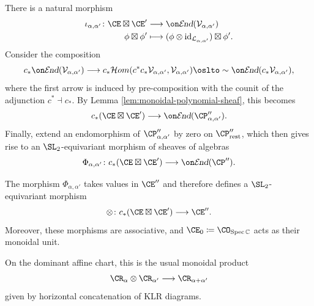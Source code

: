 \documentclass[11pt,reqno]{amsart}
\begin{document}
There is a natural morphism 
\begin{align*}
    \iota_{\alpha,\alpha'}\colon \CE\boxtimes\CE'&\longrightarrow\shend(\mathcal V_{\alpha,\alpha'})\\
    \phi\boxtimes\phi'&\longmapsto(\phi\otimes\id_{\mathcal L_{\alpha,\alpha'}})\boxtimes\phi'.
\end{align*}
Consider the composition \[c_*\shend(\mathcal V_{\alpha,\alpha'})\longrightarrow c_*\mathcal{H}om(c^*c_*\mathcal V_{\alpha,\alpha'}, \mathcal V_{\alpha,\alpha'})\simlto\shend(c_*\mathcal V_{\alpha,\alpha'}),\] where the first arrow is induced by pre-composition with the counit of the adjunction $c^*\dashv c_*.$ By Lemma \ref{lem:monoidal-polynomial-sheaf}, this becomes
\[c_*(\CE\boxtimes\CE')\longrightarrow\shend(\CP''_{\alpha,\alpha'}).\] Finally, extend an endomorphism of $\CP''_{\alpha,\alpha'}$ by zero on $\CP''_{\mathrm{rest}}$, which then gives rise to an $\SL_2$-equivariant morphism of sheaves of algebras
\[\Phi_{\alpha,\alpha'}\colon c_*(\CE\boxtimes\CE')\longrightarrow\shend(\CP'').\] 
\begin{theorem}\label{thm:A_N monoidal}
The morphism $\Phi_{\alpha,\alpha'}$ takes values in $\CE''$ and
therefore defines a $\SL_2$-equivariant morphism \[\otimes\colon c_*(\CE\boxtimes\CE')\longrightarrow\CE''.\]Moreover, these morphisms are associative, and $\CE_0\coloneqq \CO_{\Spec \BC}$ acts as their monoidal unit. 

On the dominant affine chart, this is the usual monoidal product
\[\CR_\alpha\otimes\CR_{\alpha'}\longrightarrow\CR_{\alpha+\alpha'}\]
given by horizontal concatenation of KLR diagrams.
\end{theorem}
\end{document}
